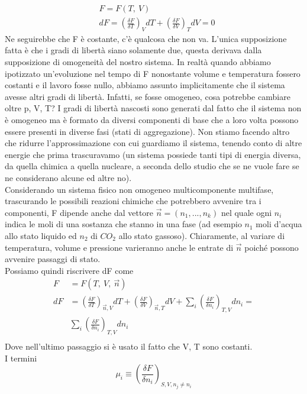 \documentclass[
10pt, %
a4paper, %
oneside, %
headinclude,footinclude, %
BCOR5mm, %
]{scrartcl}
\begin{document}
\begin{align*}
	&F = F(T,\ V)\\
	&dF = \left(\frac{\delta F}{\delta T}\right)_V dT + \left(\frac{\delta F}{\delta V}\right)_T dV = 0
\end{align*}
Ne seguirebbe che F è costante, c'è qualcosa che non va. L'unica supposizione fatta è che i gradi di libertà siano solamente due, questa derivava dalla supposizione di omogeneità del nostro sistema. In realtà quando abbiamo ipotizzato un'evoluzione nel tempo di F nonostante volume e temperatura fossero costanti e il lavoro fosse nullo, abbiamo assunto implicitamente che il sistema avesse altri gradi di libertà. Infatti, se fosse omogeneo, cosa potrebbe cambiare oltre p, V, T? I gradi di libertà nascosti sono generati dal fatto che il sistema non è omogeneo ma è formato da diversi componenti di base che a loro volta possono essere presenti in diverse fasi (stati di aggregazione). Non stiamo facendo altro che ridurre l'approssimazione con cui guardiamo il sistema, tenendo conto di altre energie che prima trascuravamo (un sistema possiede tanti tipi di energia diversa, da quella chimica a quella nucleare, a seconda dello studio che se ne vuole fare se ne considerano alcune ed altre no).\\
Considerando un sistema fisico non omogeneo multicomponente multifase, trascurando le possibili reazioni chimiche che potrebbero avvenire tra i componenti, F dipende anche dal vettore $\vec{n}=(n_1,...,n_k)$ nel quale ogni \(n_i\) indica le moli di una sostanza che stanno in una fase (ad esempio \(n_1\) moli d'acqua allo stato liquido ed \(n_2\) di \(CO_2\) allo stato gassoso). Chiaramente, al variare di temperatura, volume e pressione varieranno anche le entrate di $\vec{n}$ poiché possono avvenire passaggi di stato.\\
Possiamo quindi riscrivere dF come  
\begin{align*}
	F &= F(T,\ V,\ \vec{n})\\
	dF &= \left(\frac{\delta F}{\delta T}\right)_{\vec{n}, V} dT + \left(\frac{\delta F}{\delta V}\right)_{\vec{n}, T} dV+\sum_i \left(\frac{\delta F}{\delta n_i}\right)_{T,V} dn_i = \\
	&\sum_i \left(\frac{\delta F}{\delta n_i}\right)_{T,V} dn_i\\
\end{align*} 
Dove nell'ultimo passaggio si è usato il fatto che V, T sono costanti.\\
I termini
\[\mu_i \equiv \left(\frac{\delta F}{\delta n_i}\right)_{S,V,n_j\neq n_i}\] 
\end{document}
